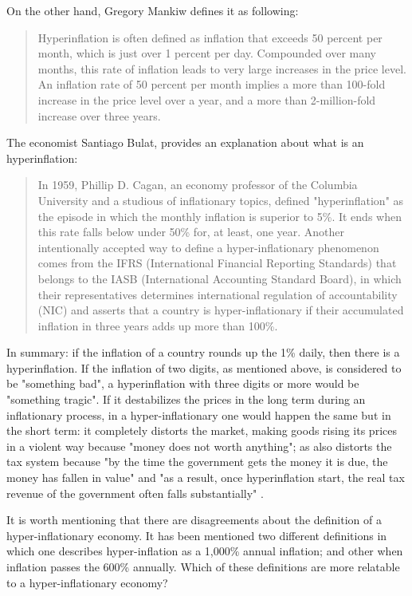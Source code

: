 \documentclass[12pt,a4paper,twoside]{book}
\begin{document}
On the other hand, Gregory Mankiw defines it as following:

\begin{quotation}
Hyperinflation is often defined as inflation that exceeds 50 percent per month, which is just over 1 percent per day. Compounded over many months, this rate of inflation leads to very large increases in the price level. An inflation rate of 50 percent per month implies a more than 100-fold increase in the price level over a year, and a more than 2-million-fold increase over three years. \cite[p. 106]{mankiw:macroeconomics}
\end{quotation}

The economist Santiago Bulat, provides an explanation about what is an hyperinflation:

\begin{quotation}
In 1959, Phillip D. Cagan, an economy professor of the Columbia University and a studious of inflationary topics, defined "hyperinflation" as the episode in which the monthly inflation is superior to 5\%. It ends when this rate falls below under 50\% for, at least, one year. Another intentionally accepted way to define a hyper-inflationary phenomenon comes from the IFRS (International Financial Reporting Standards) that belongs to the IASB (International Accounting Standard Board), in which their representatives determines international regulation of accountability (NIC) and asserts that a country is hyper-inflationary if their accumulated inflation in three years adds up more than 100\%. \cite{bulat:hiper}
\end{quotation}

In summary: if the inflation of a country rounds up the 1\% daily, then there is a hyperinflation. If the inflation of two digits, as mentioned above, is considered to be "something bad", a hyperinflation with three digits or more would be "something tragic". If it destabilizes the prices in the long term during an inflationary process, in a hyper-inflationary one would happen the same but in the short term: it completely distorts the market, making goods rising its prices in a violent way because "money does not worth anything"; as also distorts the tax system because "by the time the government gets the money it is due, the money has fallen in value" and "as a result, once hyperinflation start, the real tax revenue of the government often falls substantially" \cite[p. 107]{mankiw:macroeconomics}.

It is worth mentioning that there are disagreements about the definition of a hyper-inflationary economy. It has been mentioned two different definitions in which one describes hyper-inflation as a 1,000\% annual inflation; and other when inflation passes the 600\% annually. Which of these definitions are more relatable to a hyper-inflationary economy?
\end{document}
